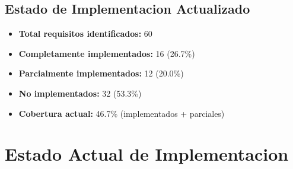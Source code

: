 \documentclass[12pt, a4paper]{article}
\begin{document}
\begin{itemize}
\subsection{Estado de Implementacion Actualizado}

\begin{itemize}
    \item \textbf{Total requisitos identificados:} 60
    \item \textbf{Completamente implementados:} 16 (26.7\%)
    \item \textbf{Parcialmente implementados:} 12 (20.0\%)
    \item \textbf{No implementados:} 32 (53.3\%)
    \item \textbf{Cobertura actual:} 46.7\% (implementados + parciales)
\end{itemize}

\section{Estado Actual de Implementacion}


\end{itemize}
\end{document}
